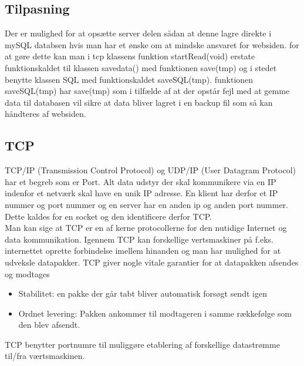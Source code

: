 \subsection{Tilpasning}
Der er mulighed for at opsætte server delen sådan at denne lagre direkte i mySQL databsen hvis man har et ønske om at mindske ansvaret for websiden. for at gøre dette kan man i tcp klassens funktion startRead(void) erstate funktionskaldet til klassen savedata() med funktionen save(tmp) og i stedet benytte klassen SQL med funktionskaldet saveSQL(tmp). funktionen saveSQL(tmp) har save(tmp) som i tilfælde af at der opstår fejl med at gemme data til databasen vil sikre at data bliver lagret i en backup fil som så kan håndteres af websiden.

\subsection{TCP}
TCP/IP (Transmission Control Protocol) og UDP/IP (User Datagram Protocol) har et begreb som er Port. Alt data udstyr der skal kommunikere via en IP indenfor et netværk skal have en unik IP adresse. En klient har derfor et IP nummer og port nummer og en server har en anden ip og anden port nummer. Dette kaldes for en socket og den identificere derfor TCP.\\

Man kan sige at TCP er en af kerne protocollerne for  den nutidige Internet og data kommunikation.
Igennem TCP kan forskellige vertsmaskiner på f.eks. internettet oprette forbindelse imellem hinanden og man har mulighed for at udveksle datapakker. TCP giver nogle vitale garantier for at datapakken afsendes og modtages
\begin{itemize}
\item Stabilitet: en pakke der går tabt bliver automatisk forsøgt sendt igen
\item Ordnet levering: Pakken ankommer til modtageren i samme rækkefølge som den blev afsendt.
\end{itemize}
TCP benytter portnumre til muliggøre etablering af forskellige datastrømme til/fra værtsmaskinen. 

